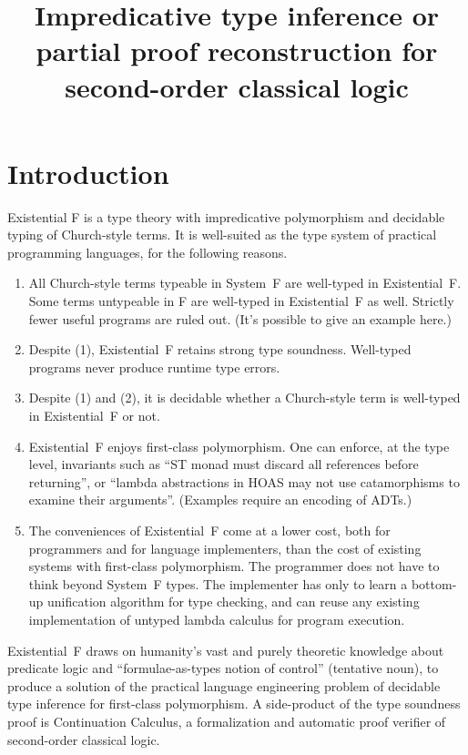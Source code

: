 \documentclass{amsart}
\title
[Impredicative type inference]
{
Impredicative type inference
\break
or
\break
partial proof reconstruction \break
for second-order classical logic
}
\begin{document}
\maketitle
\tableofcontents

\section{Introduction}

Existential F is a type theory with impredicative polymorphism
and decidable typing of Church-style terms. It is well-suited as
the type system of practical programming languages, for the
following reasons.
\begin{enumerate}
\item All Church-style terms typeable in System~F are well-typed
in Existential~F. Some terms untypeable in F are well-typed in
Existential~F as well. Strictly fewer useful programs are ruled
out. (It's possible to give an example here.)

\item Despite (1), Existential~F retains strong type soundness.
Well-typed programs never produce runtime type errors.

\item Despite (1) and (2), it is decidable whether a Church-style
term is well-typed in Existential~F or not.

\item Existential~F enjoys first-class polymorphism. One can
enforce, at the type level, invariants such as ``ST monad must
discard all references before returning'', or ``lambda
abstractions in HOAS may not use catamorphisms to examine their
arguments''. (Examples require an encoding of ADTs.)

\item The conveniences of Existential~F come at a lower cost,
both for programmers and for language implementers, than the cost
of existing systems with first-class polymorphism. The programmer
does not have to think beyond System~F types. The implementer has
only to learn a bottom-up unification algorithm for type
checking, and can reuse any existing implementation of untyped
lambda calculus for program execution.
\end{enumerate}

Existential~F draws on humanity's vast and purely theoretic
knowledge about predicate logic and ``formulae-as-types notion of
control'' (tentative noun), to produce a solution of the
practical language engineering problem of decidable type
inference for first-class polymorphism. A side-product of the
type soundness proof is Continuation Calculus, a formalization
and automatic proof verifier of second-order classical logic.
\end{document}
